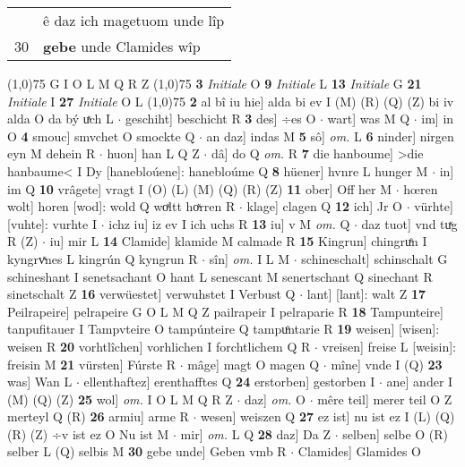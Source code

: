 \documentclass[8pt,a4paper,notitlepage]{article}
\begin{document}
\begin{table}[ht]
\begin{minipage}[t]{0.5\linewidth}
\begin{tabular}{rl}
 & ê daz ich magetuom unde lîp\\ 
30 & \textbf{gebe} unde Clamides wîp\\ 
\end{tabular}
\scriptsize
\line(1,0){75} \newline
G I O L M Q R Z \newline
\line(1,0){75} \newline
\textbf{3} \textit{Initiale} O  \textbf{9} \textit{Initiale} L  \textbf{13} \textit{Initiale} G  \textbf{21} \textit{Initiale} I  \textbf{27} \textit{Initiale} O L  \newline
\line(1,0){75} \newline
\textbf{2} al bî iu hie] alda bi ev I (M) (R) (Q) (Z) bi iv alda O da bý uͯch L  $\cdot$ geschiht] beschicht R \textbf{3} des] ÷es O  $\cdot$ wart] was M Q  $\cdot$ im] in O \textbf{4} smouc] smvchet O smockte Q  $\cdot$ an daz] indas M \textbf{5} sô] \textit{om.} L \textbf{6} ninder] nirgen eyn M dehein R  $\cdot$ huon] han L Q Z  $\cdot$ dâ] do Q \textit{om.} R \textbf{7} die hanboume] >die hanbaume< I Dy [hanebloúene]: hanebloúme Q \textbf{8} hüener] hvnre L hunger M  $\cdot$ in] im Q \textbf{10} vrâgete] vragt I (O) (L) (M) (Q) (R) (Z) \textbf{11} ober] Off her M  $\cdot$ hœren wolt] horen [wod]: wold Q woͯltt hoͯrren R  $\cdot$ klage] clagen Q \textbf{12} ich] Jr O  $\cdot$ vürhte] [vuhte]: vurhte I  $\cdot$ ichz iu] iz ev I ich uchs R \textbf{13} iu] v M \textit{om.} Q  $\cdot$ daz tuot] vnd tuͯg R (Z)  $\cdot$ iu] mir L \textbf{14} Clamide] klamide M calmade R \textbf{15} Kingrun] chingruͤn I kyngrvͯnes L kingrún Q kyngrun R  $\cdot$ sîn] \textit{om.} I L M  $\cdot$ schineschalt] schinschalt G schineshant I senetsachant O hant L senescant M senertschant Q sinechant R sinetschalt Z \textbf{16} verwüestet] verwuhstet I Verbust Q  $\cdot$ lant] [lant]: walt Z \textbf{17} Peilrapeire] pelrapeire G O L M Q Z pailrapeir I pelraparie R \textbf{18} Tampunteire] tanpufitauer I Tampvteire O tampúnteire Q tampuͦntarie R \textbf{19} weisen] [wisen]: weisen R \textbf{20} vorhtlîchen] vorhlichen I forchtlichem Q R  $\cdot$ vreisen] freise L [weisin]: freisin M \textbf{21} vürsten] Fúrste R  $\cdot$ mâge] magt O magen Q  $\cdot$ mîne] vnde I (Q) \textbf{23} was] Wan L  $\cdot$ ellenthaftez] erenthafftes Q \textbf{24} erstorben] gestorben I  $\cdot$ ane] ander I (M) (Q) (Z) \textbf{25} wol] \textit{om.} I O L M Q R Z  $\cdot$ daz] \textit{om.} O  $\cdot$ mêre teil] merer teil O Z merteyl Q (R) \textbf{26} armiu] arme R  $\cdot$ wesen] weiszen Q \textbf{27} ez ist] nu ist ez I (L) (Q) (R) (Z) ÷v ist ez O Nu ist M  $\cdot$ mir] \textit{om.} L Q \textbf{28} daz] Da Z  $\cdot$ selben] selbe O (R) selber L (Q) selbis M \textbf{30} gebe unde] Geben vmb R  $\cdot$ Clamides] Glamides O \newline

\end{minipage}
\end{table}
\end{document}
